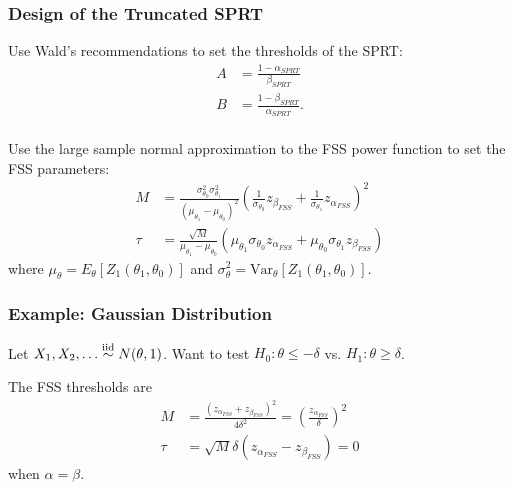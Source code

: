 \documentclass[10pt]{beamer}
\begin{document}
\begin{frame}
\frametitle{Design of the Truncated SPRT}

Use Wald's recommendations to set the thresholds of the SPRT:
\[
\begin{split}
A &= \frac{1 - \alpha_{SPRT}}{\beta_{SPRT}} \\
B &= \frac{1 - \beta_{SPRT}}{\alpha_{SPRT}}. \\
\end{split}
\]

Use the large sample normal approximation to the FSS power function to set the FSS parameters:
\[
\begin{split}
M &= \frac{\sigma_{\theta_0}^2 \sigma_{\theta_1}^2}{(\mu_{\theta_1} - \mu_{\theta_0})^2} \left(\frac{1}{\sigma_{\theta_0}} z_{\beta_{FSS}} + \frac{1}{\sigma_{\theta_1}}z_{\alpha_{FSS}}\right)^2 \\
\tau &= \frac{\sqrt{M}}{\mu_{\theta_1} - \mu_{\theta_0}} \left(\mu_{\theta_1} \sigma_{\theta_0} z_{\alpha_{FSS}} + \mu_{\theta_0} \sigma_{\theta_1} z_{\beta_{FSS}}\right)
\end{split}
\]
where $\mu_{\theta} = E_{\theta}\left[Z_1(\theta_1, \theta_0)\right]$ and $\sigma^2_{\theta} = \text{Var}_{\theta}\left[Z_1(\theta_1, \theta_0)\right]$.

\end{frame}

\begin{frame}
\frametitle{Example: Gaussian Distribution}

Let $X_1, X_2, \dots  \overset{\text{iid}}\sim N(\theta, 1)$. Want to test $H_0: \theta \leq -\delta$ vs. $H_1: \theta \geq \delta$.

The FSS thresholds are
\[
\begin{split}
M &= \frac{(z_{\alpha_{FSS}} + z_{\beta_{FSS}})^2}{4 \delta^2} = \left(\frac{z_{\alpha_{FSS}}}{\delta}\right)^2\\
\tau &= \sqrt{M} \delta (z_{\alpha_{FSS}} - z_{\beta_{FSS}}) = 0
\end{split}
\]
when $\alpha = \beta$.

\end{frame}
\end{document}
